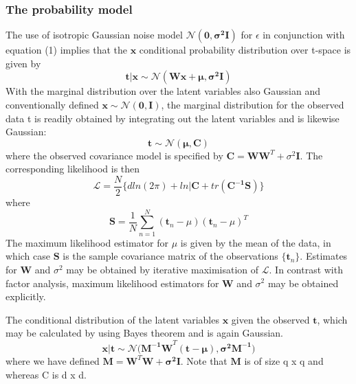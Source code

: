 \documentclass[ %
                    author={Dillon Keith Diep},
                supervisor={Dr. Carl Henrik Ek},
                    degree={MEng},
                     title={Assisted Content Generation for 3D Hair Geometry},
                  subtitle={[INCOMPLETE DRAFT, CONTAINS NOTES FROM RESEARCH]},
                      type={Research},
                      year={2014} ]{dissertation}
\begin{document}
\subsubsection{The probability model}
The use of isotropic Gaussian noise model $\mathcal{N}(\mathbf{0,\sigma^2I})$ for $\epsilon$ in conjunction with equation (1) implies that the $\mathbf{x}$ conditional probability distribution over t-space is given by 
\begin{equation}
	\mathbf{t|x\sim\mathcal{N}(Wx+\mu,\sigma^2I)}
\end{equation}
With the marginal distribution over the latent variables also Gaussian and conventionally defined $\mathbf{x\sim\mathcal{N}(0,I)}$, the marginal distribution for the observed data t is readily obtained by integrating out the latent variables and is likewise Gaussian:
\begin{equation}
	\mathbf{t\sim\mathcal{N}(\mu,C)}
\end{equation}
where the observed covariance model is specified by $\mathbf{C=WW}^T+\sigma^2\mathbf{I}$.
The corresponding likelihood is then
\begin{equation}
	\mathcal{L}=\frac{N}{2}\{d ln(2\pi)+ln|\mathbf{C}+tr(\mathbf{C^{-1}S})\}
\end{equation}
where
\begin{equation}
	\mathbf{S}=\frac{1}{N}\sum^N_{n=1}(\mathbf{t}_n-\mu)(\mathbf{t}_n-\mu)^T
\end{equation}
The maximum likelihood estimator for $\mu$ is given by the mean of the data, in which case $\mathbf{S}$ is the sample covariance matrix of the observations $\{\mathbf{t}_n\}$. Estimates for $\mathbf{W}$ and $\sigma^2$ may be obtained by iterative maximisation of $\mathcal{L}$. In contrast with factor analysis, maximum likelihood estimators for $\mathbf{W}$ and $\sigma^2$ may be obtained explicitly.

The conditional distribution of the latent variables $\mathbf{x}$ given the observed $\mathbf{t}$, which may be calculated by using Bayes theorem and is again Gaussian.
\begin{equation}
	\mathbf{x|t\sim\mathcal{N}(M^{-1}W}^T\mathbf{(t-\mu),\sigma^2M^{-1})}
\end{equation}
where we have defined $\mathbf{M=W}^T\mathbf{W+\sigma^2I}$.
Note that $\mathbf{M}$ is of size q x q and whereas C is d x d.
\end{document}
